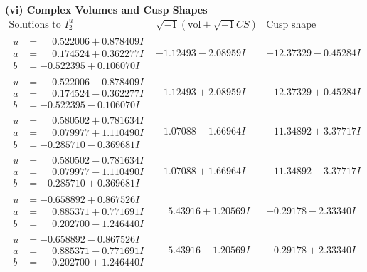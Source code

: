 \documentclass[1p]{elsarticle_modified}
\theoremstyle{definition}
\newcommand{\I}{\sqrt{-1}}
\begin{document}
\newpage\flushleft \textbf{(vi) Complex Volumes and Cusp Shapes}
$$\begin{array}{c|c|c}  
\text{Solutions to }I^u_{2}& \I (\text{vol} + \sqrt{-1}CS) & \text{Cusp shape}\\
 \hline 
\begin{aligned}
u &= \phantom{-}0.522006 + 0.878409 I \\
a &= \phantom{-}0.174524 + 0.362277 I \\
b &= -0.522395 + 0.106070 I\end{aligned}
 & -1.12493 - 2.08959 I & -12.37329 - 0.45284 I \\ \hline\begin{aligned}
u &= \phantom{-}0.522006 - 0.878409 I \\
a &= \phantom{-}0.174524 - 0.362277 I \\
b &= -0.522395 - 0.106070 I\end{aligned}
 & -1.12493 + 2.08959 I & -12.37329 + 0.45284 I \\ \hline\begin{aligned}
u &= \phantom{-}0.580502 + 0.781634 I \\
a &= \phantom{-}0.079977 + 1.110490 I \\
b &= -0.285710 - 0.369681 I\end{aligned}
 & -1.07088 - 1.66964 I & -11.34892 + 3.37717 I \\ \hline\begin{aligned}
u &= \phantom{-}0.580502 - 0.781634 I \\
a &= \phantom{-}0.079977 - 1.110490 I \\
b &= -0.285710 + 0.369681 I\end{aligned}
 & -1.07088 + 1.66964 I & -11.34892 - 3.37717 I \\ \hline\begin{aligned}
u &= -0.658892 + 0.867526 I \\
a &= \phantom{-}0.885371 + 0.771691 I \\
b &= \phantom{-}0.202700 - 1.246440 I\end{aligned}
 & \phantom{-}5.43916 + 1.20569 I & -0.29178 - 2.33340 I \\ \hline\begin{aligned}
u &= -0.658892 - 0.867526 I \\
a &= \phantom{-}0.885371 - 0.771691 I \\
b &= \phantom{-}0.202700 + 1.246440 I\end{aligned}
 & \phantom{-}5.43916 - 1.20569 I & -0.29178 + 2.33340 I \\ \hline\begin{aligned}

\end{aligned}
\end{array}$$
\end{document}
